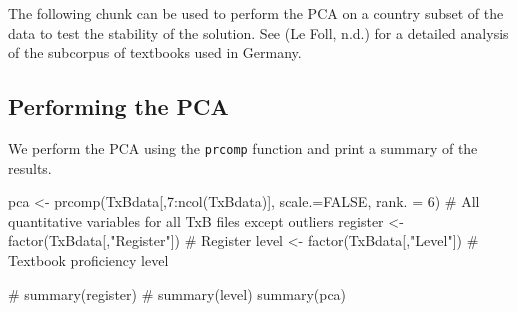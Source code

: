 \documentclass[
  letterpaper,
  DIV=11,
  numbers=noendperiod]{scrreprt}
\newenvironment{Shaded}{\begin{snugshade}}{\end{snugshade}}
\newcommand{\AttributeTok}[1]{\textcolor[rgb]{0.40,0.45,0.13}{#1}}
\newcommand{\CommentTok}[1]{\textcolor[rgb]{0.37,0.37,0.37}{#1}}
\newcommand{\ConstantTok}[1]{\textcolor[rgb]{0.56,0.35,0.01}{#1}}
\newcommand{\DecValTok}[1]{\textcolor[rgb]{0.68,0.00,0.00}{#1}}
\newcommand{\FunctionTok}[1]{\textcolor[rgb]{0.28,0.35,0.67}{#1}}
\newcommand{\NormalTok}[1]{\textcolor[rgb]{0.00,0.23,0.31}{#1}}
\newcommand{\OtherTok}[1]{\textcolor[rgb]{0.00,0.23,0.31}{#1}}
\newcommand{\SpecialCharTok}[1]{\textcolor[rgb]{0.37,0.37,0.37}{#1}}
\newcommand{\StringTok}[1]{\textcolor[rgb]{0.13,0.47,0.30}{#1}}
\begin{document}
The following chunk can be used to perform the PCA on a country subset
of the data to test the stability of the solution. See (Le Foll, n.d.)
for a detailed analysis of the subcorpus of textbooks used in Germany.

\begin{Shaded}
\end{Shaded}

\subsection{Performing the PCA}\label{performing-the-pca}

We perform the PCA using the \texttt{prcomp} function and print a
summary of the results.

\begin{Shaded}
\begin{Highlighting}[]
\NormalTok{pca }\OtherTok{\textless{}{-}} \FunctionTok{prcomp}\NormalTok{(TxBdata[,}\DecValTok{7}\SpecialCharTok{:}\FunctionTok{ncol}\NormalTok{(TxBdata)], }\AttributeTok{scale.=}\ConstantTok{FALSE}\NormalTok{, }\AttributeTok{rank. =} \DecValTok{6}\NormalTok{) }\CommentTok{\# All quantitative variables for all TxB files except outliers}
\NormalTok{register  }\OtherTok{\textless{}{-}} \FunctionTok{factor}\NormalTok{(TxBdata[,}\StringTok{"Register"}\NormalTok{]) }\CommentTok{\# Register}
\NormalTok{level }\OtherTok{\textless{}{-}} \FunctionTok{factor}\NormalTok{(TxBdata[,}\StringTok{"Level"}\NormalTok{]) }\CommentTok{\# Textbook proficiency level}

\CommentTok{\# summary(register)}
\CommentTok{\# summary(level)}
\FunctionTok{summary}\NormalTok{(pca)}
\end{Highlighting}
\end{Shaded}
\end{document}
